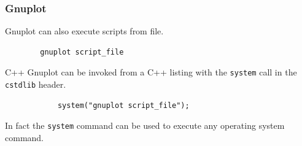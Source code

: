 \documentclass{beamer}
\begin{document}

\begin{frame}[fragile]

    \frametitle{Gnuplot}

    \begin{block}{ }
        Gnuplot can also execute scripts from file.

        \begin{verbatim}
        gnuplot script_file
        \end{verbatim}

    \end{block}

    \vspace{1cm}

    \begin{block}{C++}
        Gnuplot can be invoked from a C++ listing with the \texttt{system} call
        in the \texttt{cstdlib} header.

        \begin{verbatim}
            system("gnuplot script_file");
        \end{verbatim}

        In fact the \texttt{system} command can be used to execute any
        operating system command.
    \end{block}

\end{frame}
\end{document}
